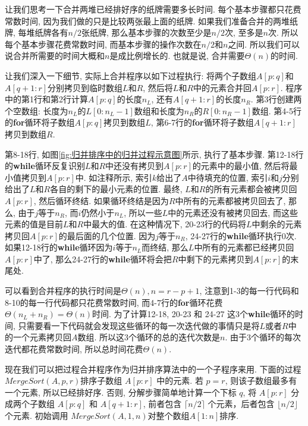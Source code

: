 \documentclass[oneside,10pt,fontset=none]{ctexbook}
\numberwithin{definition}{chapter}
\numberwithin{theorem}{chapter}
\numberwithin{lemma}{chapter}
\begin{document}
让我们思考一下合并两堆已经排好序的纸牌需要多长时间. 每个基本步骤都只花费常数时间, 因为我们做的只是比较两张最上面的纸牌. 如果我们准备合并的两堆纸牌, 每堆纸牌各有$n/2$张纸牌, 那么基本步骤的次数至少是$n/2$次, 至多是$n$次. 所以每个基本步骤花费常数时间, 而基本步骤的操作次数在$n/2$和$n$之间. 所以我们可以说合并所需要的时间大概和$n$是成比例增长的. 也就是说, 合并需要$\Theta(n)$的时间.

让我们深入一下细节, 实际上合并程序以如下过程执行: 将两个子数组$A[p:q]$和$A[q+1:r]$分别拷贝到临时数组$L$和$R$, 然后将$L$和$R$中的元素合并回$A[p:r]$. 程序中的第1行和第2行计算$A[p:q]$的长度$n_L$, 还有$A[q+1:r]$的长度$n_R$. 第3行创建两个空数组: 长度为$n_L$的$L[0:n_L-1]$数组和长度为$n_R$的$R[0:n_R-1]$数组. 第4-5行的\textbf{for}循环将子数组$A[p:q]$拷贝到数组$L$, 第6-7行的\textbf{for}循环将子数组$A[q+1:r]$拷贝到数组$R$.

第8-18行, 如图\ref{fig:归并排序中的归并过程示意图}所示, 执行了基本步骤. 第12-18行的\textbf{while}循环反复识别$L$和$R$中还没有拷贝到$A[p:r]$的元素中的最小值, 然后将最小值拷贝到$A[p:r]$中. 如注释所示, 索引$k$给出了$A$中待填充的位置, 索引$i$和$j$分别给出了$L$和$R$各自的剩下的最小元素的位置. 最终, $L$和$R$的所有元素都会被拷贝回$A[p:r]$, 然后循环终结. 如果循环终结是因为$R$中所有的元素都被拷贝回去了, 那么, 由于$j$等于$n_R$, 而$i$仍然小于$n_L$, 所以一些$L$中的元素还没有被拷贝回去, 而这些元素的值是目前$L$和$R$中最大的值. 在这种情况下, 20-23行的代码将$L$中剩余的元素拷贝回$A[p:r]$的最后面的几个位置. 因为$j$等于$n_R$, 24-27行的\textbf{while}循环执行0次. 如果12-18行的\textbf{while}循环因为$i$等于$n_L$而终结, 那么$L$中所有的元素都已经拷贝回$A[p:r]$中了, 那么24-27行的\textbf{while}循环将会把$R$中剩下的元素拷贝到$A[p:r]$的末尾处.

可以看到合并程序的执行时间是$\Theta(n), n = r - p + 1$, 注意到1-3的每一行代码和8-10的每一行代码都只花费常数时间, 而4-7行的\textbf{for}循环花费$\Theta(n_L+n_R)=\Theta(n)$时间. 为了计算12-18, 20-23 和 24-27 这3个\textbf{while}循环的时间, 只需要看一下代码就会发现这些循环的每一次迭代做的事情只是将$L$或者$R$中的一个元素拷贝回$A$数组. 所以这3个循环的总的迭代次数是$n$. 由于3个循环的每次迭代都花费常数时间, 所以总时间花费$\Theta(n)$.

现在我们可以把过程合并程序作为归并排序算法中的一个子程序来用. 下面的过程$MergeSort(A, p, r)$排序子数组 $A[p:r]$ 中的元素. 若 $p = r$, 则该子数组最多有一个元素, 所以已经排好序. 否则, 分解步骤简单地计算一个下标 $q$, 将 $A[p:r]$ 分成两个子数组 $A[p:q]$ 和 $A[q+1:r]$, 前者包含 $\lceil{n/2}\rceil$ 个元素，后者包含 $\lfloor{n/2}\rfloor$ 个元素. 初始调用 $MergeSort(A,1,n)$对整个数组$A[1:n]$排序.
\end{document}
